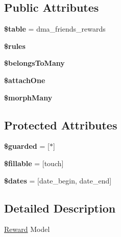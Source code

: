 \subsection*{Public Attributes}
\begin{DoxyCompactItemize}
\item 
\hypertarget{classDMA_1_1Friends_1_1Models_1_1Reward_a99affaf28976dda4adc97dfe06a6c000}{}{\bfseries \$table} = \textquotesingle{}dma\+\_\+friends\+\_\+rewards\textquotesingle{}\label{classDMA_1_1Friends_1_1Models_1_1Reward_a99affaf28976dda4adc97dfe06a6c000}

\item 
{\bfseries \$rules}
\item 
{\bfseries \$belongs\+To\+Many}
\item 
{\bfseries \$attach\+One}
\item 
{\bfseries \$morph\+Many}
\end{DoxyCompactItemize}
\subsection*{Protected Attributes}
\begin{DoxyCompactItemize}
\item 
\hypertarget{classDMA_1_1Friends_1_1Models_1_1Reward_ad1df3ebe52db8869899e29a8de5cd70d}{}{\bfseries \$guarded} = \mbox{[}\textquotesingle{}$\ast$\textquotesingle{}\mbox{]}\label{classDMA_1_1Friends_1_1Models_1_1Reward_ad1df3ebe52db8869899e29a8de5cd70d}

\item 
\hypertarget{classDMA_1_1Friends_1_1Models_1_1Reward_ae268c0f08d1cccacf8655b5028739c87}{}{\bfseries \$fillable} = \mbox{[}\textquotesingle{}touch\textquotesingle{}\mbox{]}\label{classDMA_1_1Friends_1_1Models_1_1Reward_ae268c0f08d1cccacf8655b5028739c87}

\item 
\hypertarget{classDMA_1_1Friends_1_1Models_1_1Reward_acbc452b5aadbb75acadf961a85bbc448}{}{\bfseries \$dates} = \mbox{[}\textquotesingle{}date\+\_\+begin\textquotesingle{}, \textquotesingle{}date\+\_\+end\textquotesingle{}\mbox{]}\label{classDMA_1_1Friends_1_1Models_1_1Reward_acbc452b5aadbb75acadf961a85bbc448}

\end{DoxyCompactItemize}


\subsection{Detailed Description}
\hyperlink{classDMA_1_1Friends_1_1Models_1_1Reward}{Reward} Model 

